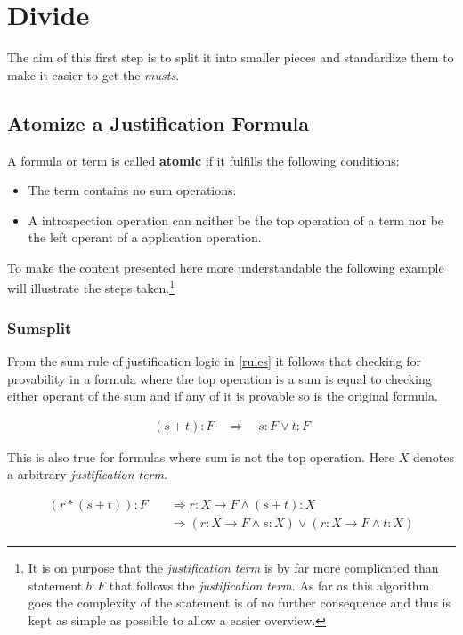 \section{Divide}\label{chap:Algorithm.divide}
The aim of this first step is to split it into smaller pieces and standardize them to make it easier to get the \emph{musts}.

\subsection{Atomize a Justification Formula}\label{chap:Algorithm.atomize}
\begin{definition}[atomic]
	A formula or term is called \textbf{atomic} if it fulfills the following conditions:
	\begin{itemize}
		\item The term contains no sum operations.
		\item A introspection operation can neither be the top operation of a term nor be the left operant of a application operation.
	\end{itemize}	
\end{definition}
To make the content presented here more understandable the following example will illustrate the steps taken.\footnote{It is on purpose that the \emph{justification term} is by far more complicated than statement $b:F$ that follows the \emph{justification term}. As far as this algorithm goes the complexity of the statement is of no further consequence and thus is kept as simple as possible to allow a easier overview.}

\subsubsection{Sumsplit}
\label{sumsplit}
From the sum rule of justification logic in \ref{rules} it follows that checking for provability in a formula where the top operation is a sum is equal to checking either operant of the sum and if any of it is provable so is the original formula.

\begin{align}\label{ss1}
	(s+t):F \quad \Rightarrow \quad s:F \lor t:F
\end{align}



This is also true for formulas where sum is not the top operation. Here $X$ denotes a arbitrary \emph{justification term}.

\begin{align}\label{ss2}
	(r*(s+t)):F  \quad & \Rightarrow r: X \rightarrow F \land (s+t): X \\
	& \Rightarrow ( r: X \rightarrow F \land s: X ) \lor ( r: X \rightarrow F \land t: X )
\end{align}

